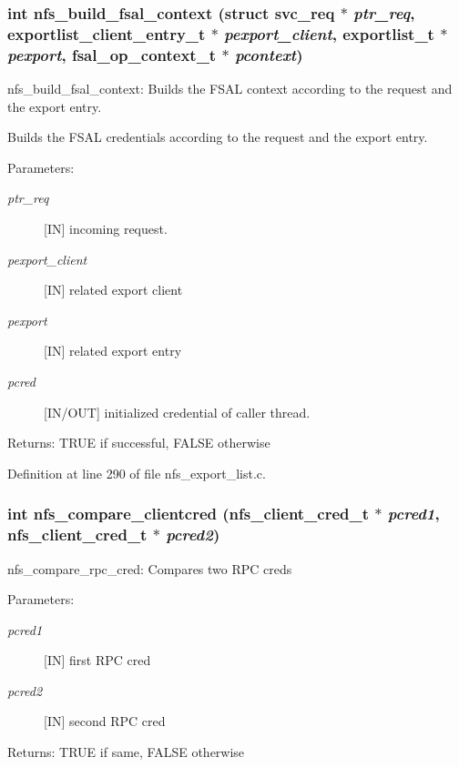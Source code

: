 \subsubsection{\setlength{\rightskip}{0pt plus 5cm}int nfs\_\-build\_\-fsal\_\-context (struct svc\_\-req $\ast$ {\em ptr\_\-req}, exportlist\_\-client\_\-entry\_\-t $\ast$ {\em pexport\_\-client}, exportlist\_\-t $\ast$ {\em pexport}, fsal\_\-op\_\-context\_\-t $\ast$ {\em pcontext})}\label{nfs__export__list_8c_a3}


nfs\_\-build\_\-fsal\_\-context: Builds the FSAL context according to the request and the export entry.

Builds the FSAL credentials according to the request and the export entry.

\begin{Desc}
\item[Parameters:]
\begin{description}
\item[{\em ptr\_\-req}][IN] incoming request. \item[{\em pexport\_\-client}][IN] related export client \item[{\em pexport}][IN] related export entry \item[{\em pcred}][IN/OUT] initialized credential of caller thread.\end{description}
\end{Desc}
\begin{Desc}
\item[Returns:]TRUE if successful, FALSE otherwise \end{Desc}


Definition at line 290 of file nfs\_\-export\_\-list.c.
\subsubsection{\setlength{\rightskip}{0pt plus 5cm}int nfs\_\-compare\_\-clientcred (nfs\_\-client\_\-cred\_\-t $\ast$ {\em pcred1}, nfs\_\-client\_\-cred\_\-t $\ast$ {\em pcred2})}\label{nfs__export__list_8c_a4}


nfs\_\-compare\_\-rpc\_\-cred: Compares two RPC creds

\begin{Desc}
\item[Parameters:]
\begin{description}
\item[{\em pcred1}][IN] first RPC cred \item[{\em pcred2}][IN] second RPC cred\end{description}
\end{Desc}
\begin{Desc}
\item[Returns:]TRUE if same, FALSE otherwise \end{Desc}


